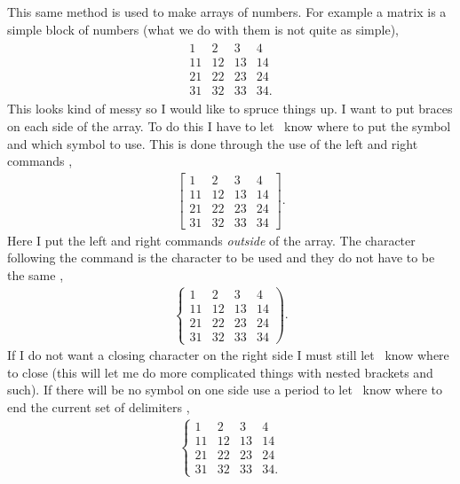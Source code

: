 This same method is used to make arrays of numbers.  For example
a matrix is a simple block of numbers (what we do with them is not
quite as simple),
\begin{eqnarray}
    \begin{array}{rrrr}
       1 &  2 &  3 &  4 \\
      11 & 12 & 13 & 14 \\
      21 & 22 & 23 & 24 \\
      31 & 32 & 33 & 34.
    \end{array}
\end{eqnarray}
This looks kind of messy so I would like to spruce things up.  I want
to put braces on each side of the array.  To do this I have to let
\lat\ know where to put the symbol and which symbol to use.  This is
done through the use of the left and right commands \cite{The-Manual},
\begin{eqnarray}
\left[
    \begin{array}{rrrr}
       1 &  2 &  3 &  4 \\
      11 & 12 & 13 & 14 \\
      21 & 22 & 23 & 24 \\
      31 & 32 & 33 & 34
    \end{array}
\right].
\end{eqnarray}
Here I put the left and right commands {\it outside} of the
array.  The character following the command is the character
to be used and they do not have to be the same \cite{The-Manual},
\begin{eqnarray}
\left\{
    \begin{array}{rrrr}
       1 &  2 &  3 &  4 \\
      11 & 12 & 13 & 14 \\
      21 & 22 & 23 & 24 \\
      31 & 32 & 33 & 34
    \end{array}
\right).
\end{eqnarray}
If I do not want a closing character on the right side I must still
let \lat\ know where to close (this will let me do more complicated
things with nested brackets and such).  If there will be no symbol on
one side use a period to let \lat\ know where to end the current
set of delimiters \cite{The-Manual},
\begin{eqnarray}
\left\{
    \begin{array}{rrrr}
       1 &  2 &  3 &  4 \\
      11 & 12 & 13 & 14 \\
      21 & 22 & 23 & 24 \\
      31 & 32 & 33 & 34.
    \end{array}
\right. 
\end{eqnarray}

